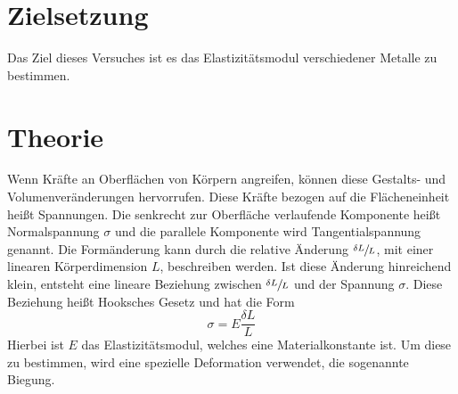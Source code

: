 \section{Zielsetzung}
Das Ziel dieses Versuches ist es das Elastizitätsmodul verschiedener Metalle zu bestimmen.

\section{Theorie}
\label{sec:Theorie}

Wenn Kräfte an Oberflächen von Körpern angreifen, können diese Gestalts- und Volumenveränderungen hervorrufen.
Diese Kräfte bezogen auf die Flächeneinheit heißt Spannungen.
Die senkrecht zur Oberfläche verlaufende Komponente heißt Normalspannung $\sigma$ und die parallele Komponente wird Tangentialspannung genannt.
Die Formänderung kann durch die relative Änderung $\sfrac{\delta L }{L}$, mit einer linearen Körperdimension $L$, beschreiben werden.
Ist diese Änderung hinreichend klein, entsteht eine lineare Beziehung zwischen $\sfrac{\delta L }{L}$ und der Spannung $\sigma$.
Diese Beziehung heißt Hooksches Gesetz und hat die Form
\begin{equation}
    \sigma = E \frac{\delta L}{L}
\end{equation}
Hierbei ist $E$ das Elastizitätsmodul, welches eine Materialkonstante ist.
Um diese zu bestimmen, wird eine spezielle Deformation verwendet, die sogenannte Biegung.
